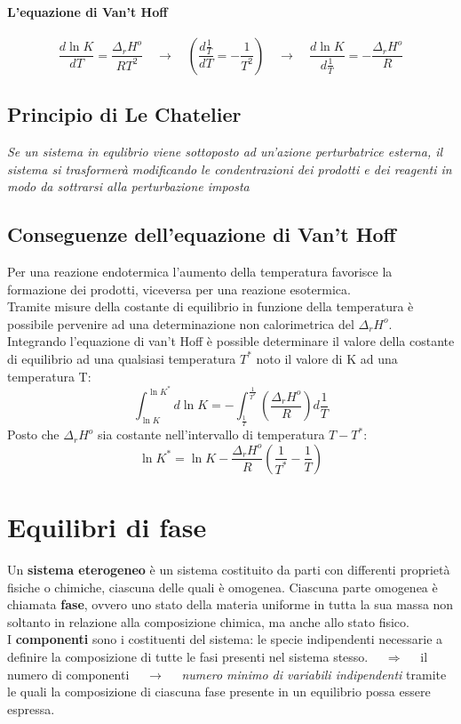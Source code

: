 \documentclass{article}
\newcommand{\so}{\quad \rightarrow \quad}
\newcommand{\So}{\quad \Rightarrow \quad}
\begin{document}
\paragraph{L'equazione di Van't Hoff}
\begin{equation*}
    \frac{d \ln K}{dT}=\frac{\Delta_rH^o}{RT^2} \so (\frac{d\frac{1}{T}}{dT}=-\frac{1}{T^2})\so \frac{d \ln K}{d\frac{1}{T}}=-\frac{\Delta_rH^o}{R}
\end{equation*}

\subsection{Principio di Le Chatelier}
\begin{center}
    \textit{Se un sistema in equlibrio viene sottoposto ad un'azione perturbatrice esterna, il sistema si trasformerà modificando le condentrazioni dei prodotti e dei reagenti in modo da sottrarsi alla perturbazione imposta}
\end{center}

\subsection{Conseguenze dell'equazione di Van't Hoff}
Per una reazione endotermica l'aumento della temperatura favorisce la formazione dei prodotti, viceversa per una reazione esotermica. \\Tramite misure della costante di equilibrio in funzione della temperatura è possibile pervenire ad una determinazione non calorimetrica del $\Delta_rH^o$.\\
Integrando l'equazione di van't Hoff è possible determinare il valore della costante di equilibrio ad una qualsiasi temperatura $T^*$ noto il valore di K ad una temperatura T:
\begin{equation*}
    \int_{\ln K}^{\ln K^*}d\ln K=-\int_{\frac{1}{T}}^{\frac{1}{T^*}}(\frac{\Delta_rH^o}{R})d\frac{1}{T}
\end{equation*}
Posto che $\Delta_rH^o$ sia costante nell'intervallo di temperatura $T-T^*$:
\begin{equation*}
    \ln K^*=\ln K-\frac{\Delta_rH^o}{R}(\frac{1}{T^*}-\frac{1}{T})
\end{equation*}

\newpage

\section{Equilibri di fase}
Un \textbf{sistema eterogeneo} è un sistema costituito da parti con differenti proprietà fisiche o chimiche, ciascuna delle quali è omogenea. Ciascuna parte omogenea è chiamata \textbf{fase}, ovvero uno stato della materia uniforme in tutta la sua massa non soltanto in relazione alla composizione chimica, ma anche allo stato fisico.\\
I \textbf{componenti} sono i costituenti del sistema: le specie indipendenti necessarie a definire la composizione di tutte le fasi presenti nel sistema stesso. $\So$ il numero di componenti $\so$ \textit{numero minimo di variabili indipendenti} tramite le quali la composizione di ciascuna fase presente in un equilibrio possa essere espressa.\\
\end{document}
